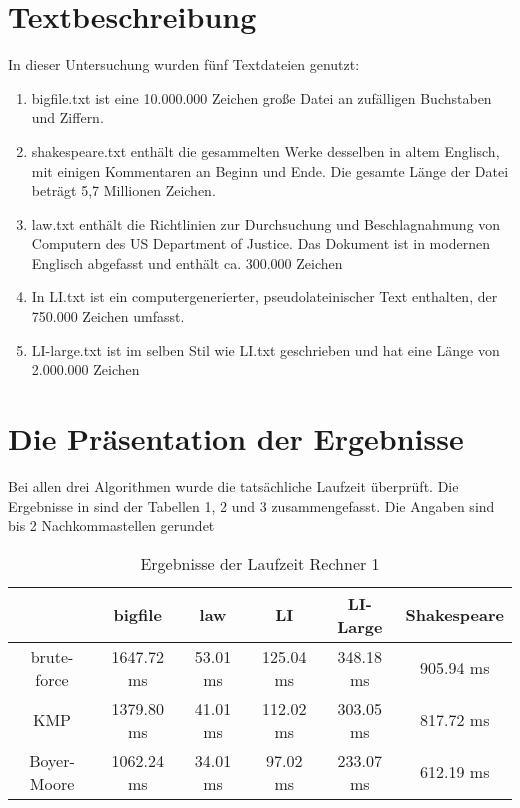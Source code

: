 \documentclass[14pt]{article}
\begin{document}
\section{Textbeschreibung}
In dieser Untersuchung wurden fünf Textdateien genutzt:\\

\begin{enumerate}
\item bigfile.txt ist eine 10.000.000 Zeichen große Datei an zufälligen Buchstaben und Ziffern.

\item shakespeare.txt enthält die gesammelten Werke desselben in altem Englisch, mit einigen Kommentaren an
 Beginn und Ende. Die gesamte Länge der Datei beträgt 5,7 Millionen Zeichen.
\item law.txt enthält die Richtlinien zur Durchsuchung und Beschlagnahmung von Computern des US Department of Justice. Das Dokument ist in modernen Englisch abgefasst und enthält ca. 300.000 Zeichen
\item In LI.txt ist ein computergenerierter,
 pseudolateinischer Text enthalten, der 750.000 Zeichen umfasst.
\item LI-large.txt ist im selben Stil wie LI.txt geschrieben und hat eine Länge von 2.000.000 Zeichen
\end{enumerate}

\section{Die Präsentation der Ergebnisse}
Bei allen drei Algorithmen wurde die tatsächliche Laufzeit überprüft. Die Ergebnisse in sind der Tabellen 1, 2 und 3 zusammengefasst. Die Angaben sind bis 2 Nachkommastellen gerundet


\begin{table}[h]
\begin{tabular}{ |c|c|c|c|c|c| }
\hline
  & bigfile & law & LI & LI-Large & Shakespeare \\
\hline 
 brute-force & 1647.72 ms & 53.01 ms & 125.04 ms& 348.18 ms & 905.94 ms\\ 
\hline
 KMP & 1379.80 ms & 41.01 ms & 112.02 ms & 303.05 ms & 817.72 ms\\ 
\hline
 Boyer-Moore & 1062.24 ms & 34.01 ms & 97.02 ms & 233.07 ms & 612.19 ms\\ 
\hline
\end{tabular}
\label{Ergebnisse}
\caption{ Ergebnisse der Laufzeit Rechner 1}
\end{table}
\end{document}
